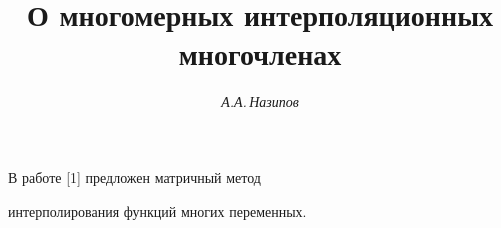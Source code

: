 




%


\newcommand{\tts}[1]{}


\renewcommand{\baselinestretch}{0.97}







\setcounter{page}{73}















\author{\it А.А.\,Назипов}




\title{О многомерных интерполяционных многочленах}





\date{}




\pagestyle{plain} %







\maketitle


\label{begin}





В работе [1] предложен матричный метод


интерполирования функций многих переменных.


